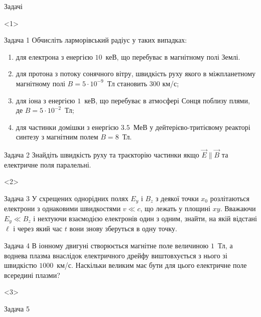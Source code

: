 \documentclass[]{beamer}
\begin{document}
\begin{frame}{Задачі}{}
	\begin{onlyenv}
		\begin{exampleblock}{Задача 1}%
			\justifying
			Обчисліть ларморівський радіус у таких випадках:
			\begin{enumerate}
				\item для електрона з енергією $10$~кеВ, що перебуває в магнітному полі Землі.
				\item для протона з потоку сонячного вітру, швидкість руху якого в
				      міжпланетному магнітному полі $B = 5\cdot10^{-9}$~Тл становить $300$ км/с;
				\item  для іона  з енергією $1$~кеВ, що перебуває в атмосфері Сонця поблизу плями, де $B = 5\cdot10^{-2}$~Тл;
				\item для частинки домішки  з енергією $3.5$~МеВ у дейтерієво-тритієвому реакторі синтезу з магнітним полем $B = 8$~Тл.
			\end{enumerate}
		\end{exampleblock}
		\begin{exampleblock}{Задача 2}%
			\justifying
			Знайдіть швидкість руху та траєкторію частинки якщо $\vec{E}\parallel\vec{B}$ та електричне поля паралельні.
		\end{exampleblock}
	\end{onlyenv}
	\begin{onlyenv}
		\begin{exampleblock}{Задача 3}%
			\justifying
			У схрещених однорідних полях $E_y$ і $B_z$ з деякої точки $x_0$ розлітаються електрони з однаковими швидкостями $v \ll c$, що лежать у площині $xy$. Вважаючи $E_y \ll B_z$ і нехтуючи взаємодією електронів один з одним, знайти, на якій відстані $\ell$ і через який час $t$ вони знову зберуться в одну точку.
		\end{exampleblock}
		\begin{exampleblock}{Задача 4}%
			\justifying
			В іонному двигуні створюється магнітне поле величиною $1$~Тл, а воднева плазма внаслідок електричного дрейфу виштовхується з нього зі швидкістю $1000$~км/с. Наскільки великим має бути для цього електричне поле всередині плазми?
		\end{exampleblock}
	\end{onlyenv}
    \begin{onlyenv}<3>
            \begin{exampleblock}{Задача 5}\justifying%

\end{exampleblock}
\end{onlyenv}
\end{frame}
\end{document}
